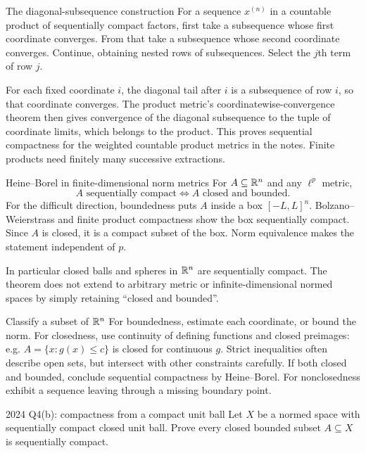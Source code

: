 \begin{note}{The diagonal-subsequence construction}
For a sequence $x^{(n)}$ in a countable product of sequentially compact factors, first take a subsequence whose first coordinate converges. From that take a subsequence whose second coordinate converges. Continue, obtaining nested rows of subsequences. Select the $j$th term of row $j$.

For each fixed coordinate $i$, the diagonal tail after $i$ is a subsequence of row $i$, so that coordinate converges. The product metric's coordinatewise-convergence theorem then gives convergence of the diagonal subsequence to the tuple of coordinate limits, which belongs to the product. This proves sequential compactness for the weighted countable product metrics in the notes. Finite products need finitely many successive extractions.
\end{note}
\begin{note}{Heine--Borel in finite-dimensional norm metrics}
For $A\subseteq\mathbb R^n$ and any $\ell^p$ metric,
\[A\text{ sequentially compact}\iff A\text{ closed and bounded}.\]
For the difficult direction, boundedness puts $A$ inside a box $[-L,L]^n$. Bolzano--Weierstrass and finite product compactness show the box sequentially compact. Since $A$ is closed, it is a compact subset of the box. Norm equivalence makes the statement independent of $p$.

In particular closed balls and spheres in $\mathbb R^n$ are sequentially compact. The theorem does not extend to arbitrary metric or infinite-dimensional normed spaces by simply retaining ``closed and bounded''.
\end{note}
\begin{method}{Classify a subset of $\mathbb R^n$}
For boundedness, estimate each coordinate, or bound the norm. For closedness, use continuity of defining functions and closed preimages: e.g. $A=\{x:g(x)\le c\}$ is closed for continuous $g$. Strict inequalities often describe open sets, but intersect with other constraints carefully. If both closed and bounded, conclude sequential compactness by Heine--Borel. For nonclosedness exhibit a sequence leaving through a missing boundary point.
\end{method}
\begin{exam}{2024 Q4(b): compactness from a compact unit ball}
Let $X$ be a normed space with sequentially compact closed unit ball. Prove every closed bounded subset $A\subseteq X$ is sequentially compact.
\end{exam}
